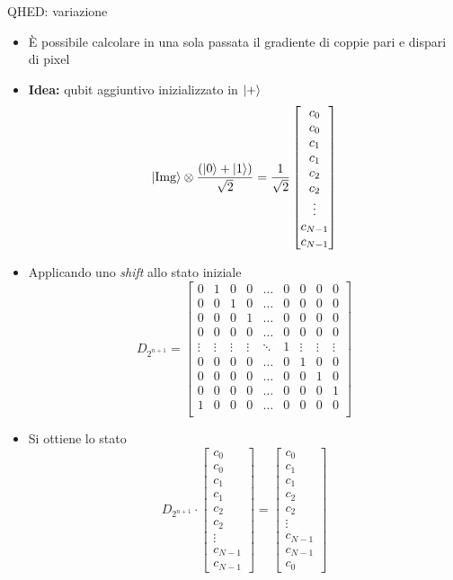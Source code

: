 \begin{frame}[allowframebreaks]{QHED: variazione}
	\begin{itemize}
		\item È possibile calcolare in una sola passata il gradiente di coppie
		pari e dispari di pixel
		\item \textbf{Idea:} qubit aggiuntivo inizializzato in $\lvert+\rangle$
		\begin{equation*}
			\lvert\text{Img}\rangle \otimes 
			\frac{(\lvert0\rangle + \lvert1\rangle)}{\sqrt 2} =
			\frac{1}{\sqrt 2} \begin{bmatrix}
				c_0\\c_0\\c_1\\c_1\\c_2\\c_2\\\vdots\\c_{N-1}\\c_{N-1}
			\end{bmatrix}
		\end{equation*}

		\item Applicando uno \emph{shift} allo stato iniziale
		\[
		D_{2^{n+1}} =
		\begin{bmatrix}
			0 & 1 & 0 & 0 & \dots  & 0 & 0 & 0 & 0 \\
			0 & 0 & 1 & 0 & \dots  & 0 & 0 & 0 & 0 \\
			0 & 0 & 0 & 1 & \dots  & 0 & 0 & 0 & 0 \\
			0 & 0 & 0 & 0 & \dots & 0 & 0 & 0 & 0 \\
			\vdots & \vdots & \vdots & \vdots & \ddots & 1 & \vdots & \vdots & \vdots \\
			0 & 0 & 0 & 0 & \dots & 0 & 1 & 0 & 0 \\
			0 & 0 & 0 & 0 & \dots & 0 & 0 & 1 & 0 \\
			0 & 0 & 0 & 0 & \dots & 0 & 0 & 0 & 1 \\
			1 & 0 & 0 & 0 & \dots & 0 & 0 & 0 & 0 \\
		\end{bmatrix}
		\]

		\item Si ottiene lo stato
		\[
		D_{2^{n+1}} \cdot \begin{bmatrix}
			c_0\\c_0\\c_1\\c_1\\c_2\\c_2\\\vdots\\c_{N-1}\\c_{N-1}
		\end{bmatrix} = \begin{bmatrix}
			c_0\\c_1\\c_1\\c_2\\c_2\\\vdots\\c_{N-1}\\c_{N-1}\\c_0
		\end{bmatrix}
		\]


\end{itemize}
\end{frame}
